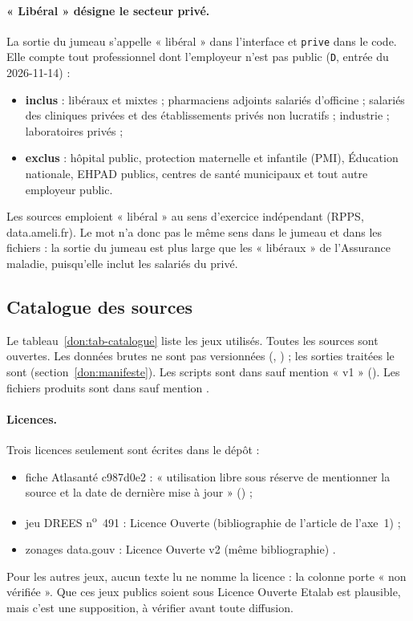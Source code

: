 \paragraph{« Libéral » désigne le secteur privé.} La sortie du jumeau s'appelle « libéral » dans l'interface et
\texttt{prive} dans le code. Elle compte tout professionnel dont l'employeur n'est pas public (\texttt{D},
entrée du 2026-11-14) :
\begin{itemize}
  \item \textbf{inclus} : libéraux et mixtes ; pharmaciens adjoints salariés d'officine ; salariés des cliniques
  privées et des établissements privés non lucratifs ; industrie ; laboratoires privés ;
  \item \textbf{exclus} : hôpital public, protection maternelle et infantile (PMI), Éducation nationale,
  EHPAD publics, centres de santé municipaux et tout autre employeur public.
\end{itemize}
Les sources emploient « libéral » au sens d'exercice indépendant (RPPS, data.ameli.fr). Le mot n'a donc pas le
même sens dans le jumeau et dans les fichiers : la sortie du jumeau est plus large que les « libéraux » de
l'Assurance maladie, puisqu'elle inclut les salariés du privé.

\subsection{Catalogue des sources}\label{don:catalogue}

Le tableau~\ref{don:tab-catalogue} liste les jeux utilisés. Toutes les sources sont ouvertes. Les données
brutes ne sont pas versionnées (, ) ; les sorties traitées le sont
(section~\ref{don:manifeste}). Les scripts sont dans  sauf mention « v1 » ().
Les fichiers produits sont dans  sauf mention .

\paragraph{Licences.} Trois licences seulement sont écrites dans le dépôt :
\begin{itemize}
  \item fiche Atlasanté c987d0e2 : « utilisation libre sous réserve de mentionner la source et la date de
  dernière mise à jour » () ;
  \item jeu DREES n\textsuperscript{o}~491 : Licence Ouverte (bibliographie de l'article de l'axe~1)
  \citep{d-drees491} ;
  \item zonages data.gouv  : Licence Ouverte v2 (même bibliographie)
  \citep{d-zonagesdatagouv}.
\end{itemize}
Pour les autres jeux, aucun texte lu ne nomme la licence : la colonne porte « non vérifiée ». Que ces jeux
publics soient sous Licence Ouverte Etalab est plausible, mais c'est une supposition, à vérifier avant toute
diffusion.

